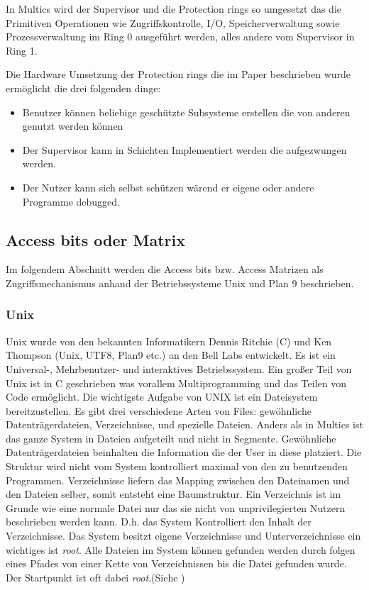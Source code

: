 \documentclass[german, 9pt,technote]{IEEEtran}
\begin{document}
        In Multics wird der Supervisor und die Protection rings so umgesetzt das die Primitiven Operationen wie Zugriffskontrolle, I/O, Speicherverwaltung sowie
        Prozessverwaltung im Ring 0 ausgef\"uhrt werden, alles andere vom Supervisor in Ring 1.
    
        Die Hardware Umsetzung der Protection rings die im Paper \cite{inproc:protec-rings} beschrieben wurde erm\"oglicht die drei folgenden dinge:
		    \begin{itemize}
		      \item Benutzer k\"onnen beliebige gesch\"utzte Subsysteme erstellen die von anderen genutzt werden k\"onnen
		      \item Der Supervisor kann in Schichten Implementiert werden die aufgezwungen werden.
		      \item Der Nutzer kann sich selbst sch\"utzen w\"arend er eigene oder andere Programme debugged.
		    \end{itemize}
    
    \subsection{Access bits oder Matrix} \label{sec:secure:access}
      Im folgendem Abschnitt werden die Access bits bzw. Access Matrizen als Zugriffsmechanismus anhand der Betriebssysteme Unix und Plan 9 beschrieben.
      \subsubsection{Unix}
		    Unix wurde von den bekannten Informatikern Dennis Ritchie (C) und Ken Thompson (Unix, UTF8, Plan9 etc.) an den Bell Labs entwickelt.
		    Es ist ein Universal-, Mehrbenutzer- und interaktives Betriebssystem. Ein gro\ss er Teil von Unix ist in C geschrieben was vorallem Multiprogramming
		    und das Teilen von Code erm\"oglicht. Die wichtigste Aufgabe von UNIX ist ein Dateisystem bereitzustellen. Es gibt drei verschiedene Arten von Files:
		    gew\"ohnliche Datentr\"agerdateien, Verzeichnisse, und spezielle Dateien. Anders als in Multics ist das ganze System in Dateien aufgeteilt und nicht in
		    Segmente. Gew\"ohnliche Datentr\"agerdateien beinhalten die Information die der User in diese platziert. Die Struktur wird nicht vom System kontrolliert maximal
		    von den zu benutzenden Programmen. Verzeichnisse liefern das Mapping zwischen den Dateinamen und den Dateien selber, somit entsteht eine Baumstruktur.
		    Ein Verzeichnis ist im Grunde wie eine normale Datei nur das sie nicht von unprivilegierten Nutzern beschrieben werden kann. D.h. das System Kontrolliert den
		    Inhalt der Verzeichnisse. Das System besitzt eigene Verzeichnisse und Unterverzeichnisse ein wichtiges ist \textit{root}.
		    Alle Dateien im System k\"onnen gefunden werden durch folgen eines Pfades von einer Kette von Verzeichnissen bis die Datei gefunden wurde. 
		    Der Startpunkt ist oft dabei \textit{root}.(Siehe \cite[S. 366]{inproc:unix})
		    
\end{document}
